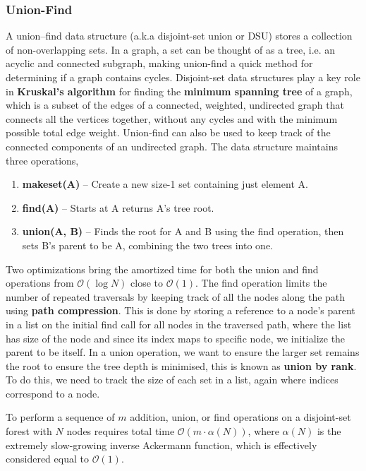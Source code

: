\documentclass{article}
\newcommand{\bigO}{\mathcal{O}}
\begin{document}
\subsubsection{Union-Find}
A union–find data structure (a.k.a disjoint-set union or DSU) stores a collection of non-overlapping sets. In a graph, a set can be thought of as a tree, i.e. an acyclic and connected subgraph, making union-find a quick method for determining if a graph contains cycles. Disjoint-set data structures play a key role in \textbf{Kruskal's algorithm} for finding the \textbf{minimum spanning tree} of a graph, which is a subset of the edges of a connected, weighted, undirected graph that connects all the vertices together, without any cycles and with the minimum possible total edge weight. Union-find can also be used to keep track of the connected components of an undirected graph. The data structure maintains three operations,
\begin{enumerate}
    \item \textbf{makeset(A)} -- Create a new size-1 set containing just element A.
    \item \textbf{find(A)} -- Starts at A returns A's tree root.
    \item \textbf{union(A, B) } --  Finds the root for A and B using the find operation, then sets B's parent to be A, combining the two trees into one.
\end{enumerate}

Two optimizations bring the amortized time for both the union and find operations from $\bigO(\log N)$ close to $\bigO(1)$. The find operation limits the number of repeated traversals by keeping track of all the nodes along the path using \textbf{path compression}. This is done by storing a reference to a node's parent in a list on the initial find call for all nodes in the traversed path, where the list has size of the node and since its index maps to specific node, we initialize the parent to be itself. In a union operation, we want to ensure the larger set  remains the root to ensure the tree depth is minimised, this is known as \textbf{union by rank}. To do this, we need to track the size of each set in a list, again where indices correspond to a node. 

To perform a sequence of $m$ addition, union, or find operations on a disjoint-set forest with $N$ nodes requires total time $\bigO(m \cdot \alpha(N))$, where $\alpha(N)$ is the extremely slow-growing inverse Ackermann function, which is effectively considered equal to $\bigO(1)$.
\end{document}
